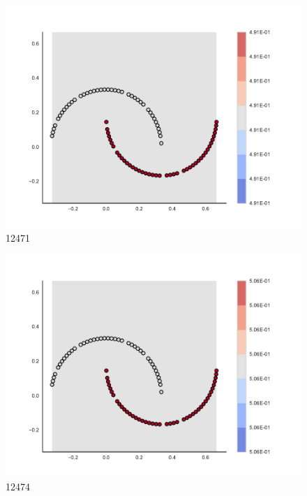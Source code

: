 \begin{subfigure}[b]{0.09\textwidth}
    \includegraphics[clip, trim=2.35cm 1.75cm 4.5cm 0cm,width=\textwidth]{img/convergence/12471.pdf}
    \caption{12471}
    \label{fig:convergence_12471}
\end{subfigure}
%
\begin{subfigure}[b]{0.09\textwidth}
    \includegraphics[clip, trim=2.35cm 1.75cm 4.5cm 0cm,width=\textwidth]{img/convergence/12474.pdf}
    \caption{12474}
    \label{fig:convergence_12474}
\end{subfigure}
%
